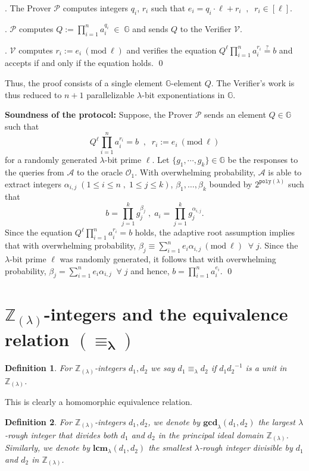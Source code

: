 \documentclass[11pt, lettersize, notitlepage, leqno, footskip=0.6cm]{article}
\newcommand{\bz}{\mathbb Z}
\newcommand{\pl}{\prod\limits}
\newcommand{\slim}{\sum\limits}
\newcommand{\ttt}{\texttt}
\newcommand{\bG}{\mathbb{G}}
\newcommand{\eqlam}{\equiv_{\lam}}
\newcommand{\mc}{\mathcal}
\newcommand{\mbf}{\mathbf}
\newcommand{\al}{\alpha}
\newcommand{\be}{\beta}
\newcommand{\lam}{\lambda}
\newcommand{\lamb}{\lambda}
\newcommand{\bzlam}{\bz_{(\lam)}}
\newcommand{\mP}{\mc{P}}
\newcommand{\A}{\mc{A}}
\newcommand{\V}{\mc{V}}
\newcommand{\vs}{\vspace{-0.15cm}}
\newcommand{\noin}{\noindent}
\newcommand{\op}{overwhelming probability}
\newcommand{\sta}{\stackrel{?}{=}}
\newcommand{\Mod}[1]{\ (\mathrm{mod}\ #1)}
\newcommand{\LCM}{\mbf{lcm}}
\newcommand{\GCD}{\mbf{gcd}}
\newtheorem{Def}{Definition}[section]
\numberwithin{equation}{section}
\begin{document}
{{{\begin{enumerate}[wide, labelwidth=!, labelindent=0pt]
\noin 2. The Prover $\mP$ computes integers $q_i$, $r_i$ such that $e_i = q_i\cdot \ell + r_i\;\;,\;\; r_i\in[\ell] .$

\noin 3. $\mP$ computes $Q:= \prod_{i=1}^n a_i^{q_i}\;\in\;\bG$ and sends $Q$ to the Verifier $\V$.

\noin 4. $\V$ computes $r_i:= e_i\Mod{\ell}$ and verifies the equation $ Q^{\ell}\prod_{i=1}^n a_i^{r_i} \sta b $ and accepts if and only if the equation holds. \qed  \end{enumerate}

Thus, the proof consists of a single element $\bG$-element $Q$. The Verifier's work is thus reduced to $n+1$ parallelizable $\lam$-bit exponentiations in $\bG$.\vspace{0.15cm}  

\noin \textbf{Soundness of the protocol:} Suppose, the Prover $\mP$ sends an element $Q\in\bG$ such that \vs $$Q^{\ell}\pl_{i=1}^n a_i^{r_i} = b\;\;,\;\;r_i:= e_i\Mod{\ell}$$ for a randomly generated $\lam$-bit prime $\ell$. Let $\{g_1,\cdots,g_k\}\in \bG$ be the responses to the queries from $\A$ to the oracle $\mc{O}_1$. With \op, $\A$ is able to extract integers $\al_{i,j}\; (1\leq i \leq n\;,\;1\leq j \leq k)$, $\be_1,\dots, \be_k$ bounded by $2^{\ttt{poly}(\lam)}$ such that \vs $$b = \pl_{j=1}^k g_j^{\be_j}\;,\;a_i = \pl_{j=1}^k g_j^{\al_{i,j}} .$$ Since the equation $Q^{\ell}\pl_{i=1}^n a_i^{r_i} = b $ holds, the adaptive root assumption implies that with \op, $\be_j\equiv \slim_{i=1}^n e_i\al_{i, j}\Mod{\ell}\;\;\forall\; j.$ Since the $\lam$-bit prime $\ell$ was randomly generated, it follows that with \op, $ \be_j = \slim_{i=1}^n e_i\al_{i, j}\;\;\forall\; j$ and hence, $b = \pl_{i=1}^n a_i^{e_i}$. \qed

\section{\fontsize{11}{11}\selectfont $\bz_{(\lamb)}$-integers and the equivalence relation $\mathbf{(\equiv_{\lam})}$}


\begin{Def} For $\bzlam$-integers $d_1,d_2$ we say $d_1\eqlam d_2$ if ${d_1}{d_2}^{-1}$ is a unit in $\bzlam$.\end{Def}

\noin \hypertarget{shortcut}{This is clearly a homomorphic equivalence relation}.

\begin{Def} For $\bzlam$-integers $d_1,d_2$, we denote by $\GCD_{\lam}(d_1,d_2)$ the largest $\lam$-rough integer that divides both $d_1$ and $d_2$ in the principal ideal domain $\bzlam$. Similarly, we denote by $\LCM_{\lam}(d_1,d_2)$ the smallest $\lam$-rough integer divisible by $d_1$ and $d_2$ in $\bzlam$.\end{Def}

}}}
\end{document}
